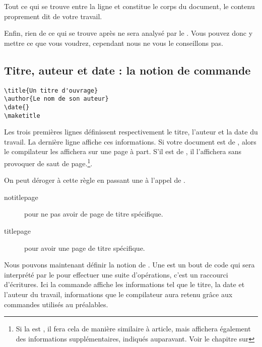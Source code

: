 Tout ce qui se trouve entre la ligne \verb|| et \verb|| constitue le corps du document, le contenu proprement dit de votre travail.

Enfin, rien de ce qui se trouve après \verb|| ne sera analysé par le . Vous pouvez donc y mettre ce que vous voudrez, cependant nous ne vous le conseillons pas.

\subsection{Titre, auteur et date : la notion de commande}

\begin{verbatim}
\title{Un titre d'ouvrage}
\author{Le nom de son auteur}
\date{}
\maketitle
\end{verbatim}

Les trois premières lignes définissent respectivement le titre, l'auteur et la date du travail.  
La dernière ligne affiche ces informations. Si votre document est de  , alors le compilateur les affichera sur une page à part. S'il est de  , il l'affichera sans provoquer de saut de page.\footnote{Si la  est , il fera cela de manière similaire à article, mais affichera également des informations supplémentaires, indiqués auparavant. Voir le chapitre sur }.

On peut déroger à cette règle en passant une  à l'appel de .
\begin{description}
\item[notitlepage] pour ne pas avoir de page de titre spécifique.
\item[titlepage] pour avoir une page de titre spécifique.
\end{description}

Nous pouvons maintenant définir la notion de . Une  est un bout de code qui sera interprété par le  pour effectuer une suite d'opérations, c'est un raccourci d'écritures. 
Ici la commande  affiche les informations tel que le titre, la date et l'auteur du travail, informations que le compilateur aura retenu grâce aux commandes utilisés au préalables.

